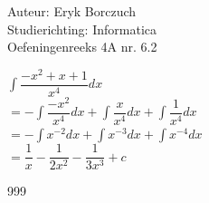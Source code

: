 \documentclass[a4paper]{article}
\begin{document}
  
\noindent \large Auteur: Eryk Borczuch \\
\noindent \large Studierichting: Informatica\\
\noindent \large Oefeningenreeks 4A nr. 6.2\\

\medskip

\normalsize

$\displaystyle\int \dfrac{-x^2+x+1}{x^4}dx $\\

$= - \displaystyle\int \dfrac{-x^2}{x^4}dx + \displaystyle\int \dfrac{x}{x^4}dx + \displaystyle\int \dfrac{1}{x^4}dx$\\

$= -\displaystyle\int x^{-2} dx + \displaystyle\int x^{-3}dx+ \displaystyle\int x^{-4}dx$\\

$= \dfrac{1}{x} - \dfrac{1}{2x^2} - \dfrac{1}{3x^3} + c $\\

\begin{thebibliography}{999}
\end{thebibliography}
\end{document}
